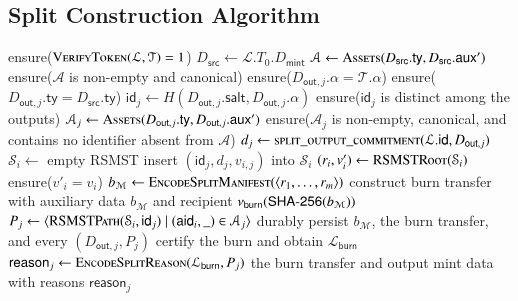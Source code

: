 \subsection{Split Construction Algorithm}\label{app:split-construction}

\begin{algorithm}[!htbp]
	\caption{Split Construction}\label{alg:split-construction}
	\begin{algorithmic}[0]
			\State ensure($\Call{VerifyToken}{\mathcal{L},\mathcal{T}}=1$)
			\State $D_\mathsf{src}\gets\mathcal{L}.T_0.D_\mathsf{mint}$
			\State $\mathcal{A}\gets\Call{Assets}{D_\mathsf{src}.\mathsf{ty},D_\mathsf{src}.\auxd'}$
			\State ensure($\mathcal{A}$ is non-empty and canonical)
				\State ensure($D_{\mathsf{out},j}.\alpha=\mathcal{T}.\alpha$)
				\State ensure($D_{\mathsf{out},j}.\mathsf{ty}=D_\mathsf{src}.\mathsf{ty}$)
				\State $\mathsf{id}_j\gets H(D_{\mathsf{out},j}.\mathsf{salt},D_{\mathsf{out},j}.\alpha)$
				\State ensure($\mathsf{id}_j$ is distinct among the outputs)
				\State $\mathcal{A}_j\gets\Call{Assets}{D_{\mathsf{out},j}.\mathsf{ty},D_{\mathsf{out},j}.\auxd'}$
				\State ensure($\mathcal{A}_j$ is non-empty, canonical, and contains no identifier absent from $\mathcal{A}$)
				\State $d_j\gets\Call{split\_output\_commitment}{\mathcal{L}.\mathsf{id},D_{\mathsf{out},j}}$
			\EndFor
				\State $\mathcal{S}_i\gets$ empty RSMST
						\State insert $(\mathsf{id}_j,d_j,v_{i,j})$ into $\mathcal{S}_i$
					\EndIf
				\EndFor
				\State $(r_i,v'_i)\gets\Call{RSMSTRoot}{\mathcal{S}_i}$
				\State ensure($v'_i=v_i$)
			\EndFor
			\State $b_\mathcal{M}\gets\Call{EncodeSplitManifest}{\langle r_1,\ldots,r_m\rangle}$
			\State construct burn transfer with auxiliary data $b_\mathcal{M}$ and recipient $\nu_\mathsf{burn}(\mathsf{SHA\text{-}256}(b_\mathcal{M}))$
				\State $P_j\gets\langle\Call{RSMSTPath}{\mathcal{S}_i,\mathsf{id}_j}\mid(\mathsf{aid}_i,\_)\in\mathcal{A}_j\rangle$
			\EndFor
			\State durably persist $b_\mathcal{M}$, the burn transfer, and every $(D_{\mathsf{out},j},P_j)$
			\State certify the burn and obtain $\mathcal{L}_\mathsf{burn}$
				\State $\mathsf{reason}_j\gets\Call{EncodeSplitReason}{\mathcal{L}_\mathsf{burn},P_j}$
			\EndFor
			\State \Return the burn transfer and output mint data with reasons $\mathsf{reason}_j$
		\EndFunction
	\end{algorithmic}
\end{algorithm}


